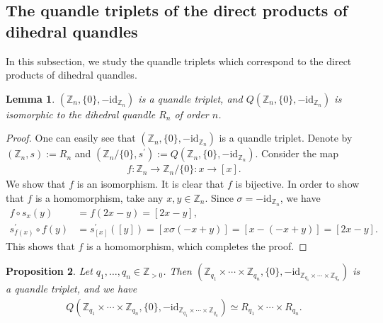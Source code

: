 \documentclass[12pt]{amsart}
\newtheorem{Prop}{Proposition}[section]
\newtheorem{Lem}[Prop]{Lemma}
\theoremstyle{definition}
\begin{document}
\subsection{The quandle triplets of the direct products of dihedral quandles}\label{subse3.3}

In this subsection, we study the quandle triplets which correspond to the direct products of dihedral quandles.

\begin{Lem}\label{Lem3.8}
$ ({{\mathbb Z}}_{n}, \{0\}, -{\mathrm{id}}_{{{\mathbb Z}}_{n}}) $ is a quandle triplet, and $ Q({{\mathbb Z}}_{n},\{0\},-{\mathrm{id}}_{{{\mathbb Z}}_{n}}) $ is isomorphic to the dihedral quandle $ R_{n} $ of order $ n $.
\end{Lem}

\begin{proof}
One can easily see that $ ({{\mathbb Z}}_{n}, \{0\}, -{\mathrm{id}}_{{{\mathbb Z}}_{n}}) $ is a quandle triplet. Denote by $ ({{\mathbb Z}}_{n},s) := R_{n} $ and $ ({{\mathbb Z}}_{n}/\{0\},s^{\prime}) := Q({{\mathbb Z}}_{n},\{0\},-{\mathrm{id}}_{{{\mathbb Z}}_{n}}) $. Consider the map
\begin{align*}
f : {{\mathbb Z}}_{n} \rightarrow {{\mathbb Z}}_{n}/\{0\} : x \rightarrow [x].
\end{align*}
We show that $ f $ is an isomorphism. It is clear that $ f $ is bijective. In order to show that $ f $ is a homomorphism, take any $ x,y \in {{\mathbb Z}}_{n} $. Since $ \sigma = -{\mathrm{id}}_{{{\mathbb Z}}_{n}} $, we have
\begin{align*}
f \circ s_{x}(y) &= f (2x-y) = [2x-y],\\
s^{\prime}_{f(x)} \circ f(y) &= s^{\prime}_{[x]}([y]) = [x \sigma(-x+y)] = [x-(-x+y)] = [2x-y].
\end{align*}
This shows that $ f $ is a homomorphism, which completes the proof.
\end{proof}

\begin{Prop}\label{Prop3.9}
Let $ q_{1}, \ldots, q_{n} \in {{\mathbb Z}}_{>0} $. Then $ ({{\mathbb Z}}_{q_{1}} \times \cdots \times {{\mathbb Z}}_{q_{n}}, \{ 0 \}, -{\mathrm{id}}_{{{\mathbb Z}}_{q_{1}} \times \cdots \times {{\mathbb Z}}_{q_{n}}}) $ is a quandle triplet, and we have
\begin{align*}
Q({{\mathbb Z}}_{q_{1}} \times \cdots \times {{\mathbb Z}}_{q_{n}}, \{ 0 \}, -{\mathrm{id}}_{{{\mathbb Z}}_{q_{1}} \times \cdots \times {{\mathbb Z}}_{q_{n}}}) \simeq R_{q_{1}} \times \cdots \times R_{q_{n}}.
\end{align*}
\end{Prop}
\end{document}
